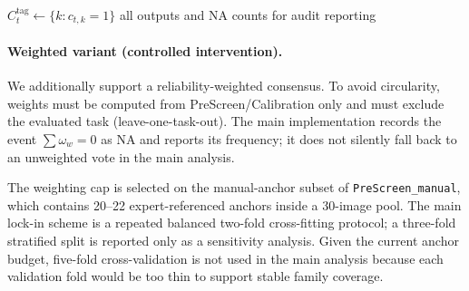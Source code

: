 \begin{algorithm}[t]
\caption{Per-tag (unweighted) consensus for multi-select meta-labels}
\label{alg:tag-consensus}

$C_t^{\mathrm{tag}}\leftarrow\{k: c_{t,k}=1\}$
\Return all outputs and NA counts for audit reporting\;
\end{algorithm}

\paragraph{Weighted variant (controlled intervention).}
We additionally support a reliability-weighted consensus. To avoid circularity, weights must be computed
from PreScreen/Calibration only and must exclude the evaluated task (leave-one-task-out).
The main implementation records the event $\sum\omega_w=0$ as NA and reports its frequency; it does not
silently fall back to an unweighted vote in the main analysis.

The weighting cap is selected on the manual-anchor subset of \texttt{PreScreen\_manual}, which contains
20--22 expert-referenced anchors inside a 30-image pool. The main lock-in scheme is a repeated balanced
two-fold cross-fitting protocol; a three-fold stratified split is reported only as a sensitivity analysis.
Given the current anchor budget, five-fold cross-validation is not used in the main analysis because each
validation fold would be too thin to support stable family coverage.

